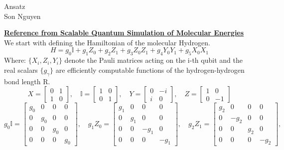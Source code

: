 \documentclass{article}
\begin{document}
\begin{center}
	\LARGE{Ansatz}\\[1em]
	\large Son Nguyen\\[1em]
\end{center}

\noindent \href{https://journals.aps.org/prx/abstract/10.1103/PhysRevX.6.031007}{\textbf{Reference from Scalable Quantum Simulation of Molecular Energies}} \\
\tableofcontents
\newpage
We start with defining the Hamiltonian of the molecular Hydrogen.
\[H = g_0 \mathbb{I} + g_1 Z_0 + g_2 Z_1 + g_3 Z_0 Z_1 + g_4 Y_0 Y_1 + g_5 X_0 X_ 1\]
Where: $\{X_i, Z_i, Y_i\}$ denote the Pauli matrices acting on the i-th qubit and the real scalars $\{g_\gamma\}$ are efficiently computable functions of the hydrogen-hydrogen bond length R.
\[
	X = \begin{bmatrix}
		0 & 1 \\
		1 & 0
	\end{bmatrix} , \quad
	\mathbb{I} = \begin{bmatrix}
		1 & 0 \\
		0 & 1
	\end{bmatrix}, \quad
	Y = \begin{bmatrix}
		0 & -i \\
		i & 0
	\end{bmatrix}, \quad
	Z = \begin{bmatrix}
		1 & 0  \\
		0 & -1
	\end{bmatrix}
\]
\[g_0 \mathbb{I} = \begin{bmatrix}
		g_0 & 0   & 0   & 0   \\
		0   & g_0 & 0   & 0   \\
		0   & 0   & g_0 & 0   \\
		0   & 0   & 0   & g_0
	\end{bmatrix}, \quad
	g_1 Z_0 = \begin{bmatrix}
		g_1 & 0   & 0    & 0    \\
		0   & g_1 & 0    & 0    \\
		0   & 0   & -g_1 & 0    \\
		0   & 0   & 0    & -g_1
	\end{bmatrix}, \quad
	g_2 Z_1 = \begin{bmatrix}
		g_2 & 0    & 0   & 0    \\
		0   & -g_2 & 0   & 0    \\
		0   & 0    & g_2 & 0    \\
		0   & 0    & 0   & -g_2
	\end{bmatrix}, \quad
\]
\end{document}
